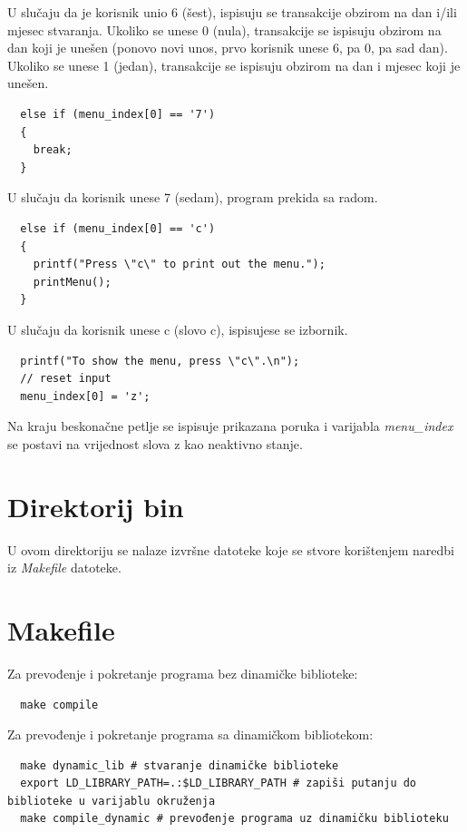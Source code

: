 \documentclass[12pt, letterpaper]{article}
\begin{document}
  U slučaju da je korisnik unio 6 (šest), ispisuju se transakcije obzirom na dan i/ili mjesec stvaranja. Ukoliko se unese 0 (nula), transakcije se ispisuju obzirom na dan koji je unešen (ponovo novi unos, prvo korisnik unese 6, pa 0, pa sad dan). Ukoliko se unese 1 (jedan), transakcije se ispisuju obzirom na dan i mjesec koji je unešen.
  

  \begin{verbatim}
  else if (menu_index[0] == '7')
  { 
    break;
  } 
  \end{verbatim}
  U slučaju da korisnik unese 7 (sedam), program prekida sa radom.

  \begin{verbatim}
  else if (menu_index[0] == 'c')
  {
    printf("Press \"c\" to print out the menu.");
    printMenu();
  }
  \end{verbatim}
  U slučaju da korisnik unese c (slovo c), ispisujese se izbornik.

  \begin{verbatim}
  printf("To show the menu, press \"c\".\n");
  // reset input
  menu_index[0] = 'z';
  \end{verbatim}
  Na kraju beskonačne petlje se ispisuje prikazana poruka i varijabla \textit{menu\_index} se postavi na vrijednost slova z kao neaktivno stanje.

\section{Direktorij bin}
  U ovom direktoriju se nalaze izvršne datoteke koje se stvore korištenjem naredbi iz \textit{Makefile} datoteke.

\section{Makefile}
  Za prevođenje i pokretanje programa bez dinamičke biblioteke: 
  \begin{verbatim}
  make compile
  \end{verbatim}

  Za prevođenje i pokretanje programa sa dinamičkom bibliotekom: 
  \begin{verbatim}
  make dynamic_lib # stvaranje dinamičke biblioteke
  export LD_LIBRARY_PATH=.:$LD_LIBRARY_PATH # zapiši putanju do biblioteke u varijablu okruženja
  make compile_dynamic # prevođenje programa uz dinamičku biblioteku
  \end{verbatim}


  
\end{document}
